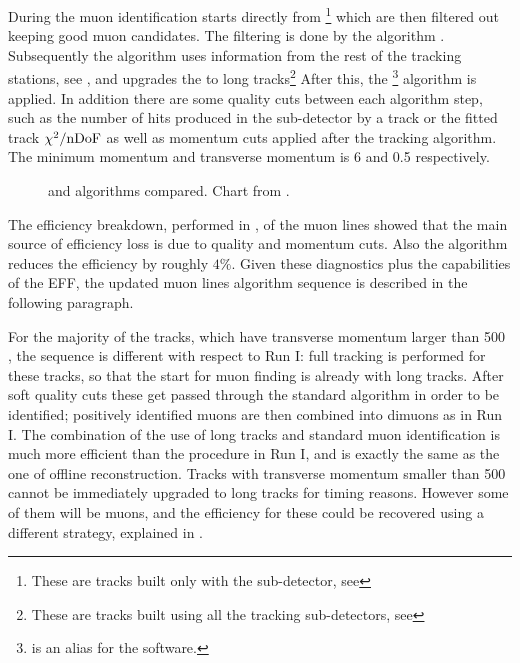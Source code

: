 During \runone the muon identification starts directly from \veloTracks\footnote{These are tracks built only with the \velo sub-detector, see }
which are then filtered out keeping good muon candidates. The filtering is done by the \mvm algorithm \cite{LHCb-PUB-2011-017}.
Subsequently the \FwD algorithm uses information from the rest of the tracking stations, see , and
upgrades the \veloTracks to long tracks\footnote{These are tracks built using all the tracking sub-detectors, see }
After this, the \isMuon\footnote{\isMuon is an alias for the \muonID software.} algorithm is applied.
In addition there are some quality cuts between each algorithm step, such as the number of hits produced in the
\velo sub-detector by a track or the fitted track $\chi^2/{\rm nDoF}$ as well as momentum cuts applied after the \FwD
tracking algorithm. The minimum momentum and transverse momentum is 6 \gevc and 0.5 \gevc respectively.

\begin{figure}[t]
  \centering
  \scalebox{1}{}
  \scalebox{1}{}
 \caption{ \runone and \runtwo \hltone algorithms compared. Chart from \cite{kevinThesis}.}
  \label{hlt1_algo_seq}
\end{figure}

The efficiency breakdown, performed in \cite{kevinThesis}, of the \runone \hltone muon lines showed that the
main source of efficiency loss is due to quality and momentum cuts. Also the \mvm algorithm reduces the
efficiency by roughly $4\%$. Given these diagnostics plus the \runtwo capabilities of the EFF, the updated
\hltone muon lines algorithm sequence is described in the following paragraph.

For the majority of the tracks, which have transverse momentum larger than 500 \mevc, the sequence is different with respect to
Run I: full tracking is performed for these tracks, so that the start for muon finding is already with long tracks.
After soft quality cuts these get passed through the standard \isMuon algorithm in order to be identified;
positively identified muons are then combined into dimuons as in Run I.
The combination of the use of long tracks and standard muon identification is much more efficient than the
procedure in Run I, and is exactly the same as the one of offline reconstruction.
Tracks with transverse momentum smaller than 500 \mevc cannot be immediately upgraded to long tracks for timing reasons.
However some of them will be muons, and the efficiency for these could be recovered using a different strategy,
explained in .
